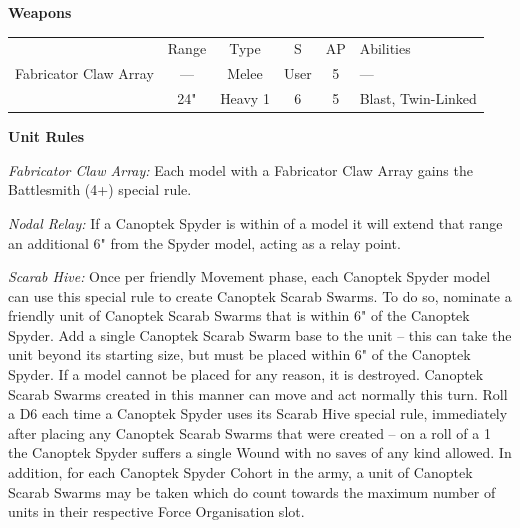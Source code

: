 \begin{minipage}[t]{0.72\textwidth}
	\vspace*{2em}
	\textbf{Weapons}
	
	\begin{tabular}{m{95 pt} *{4}{c} >{\raggedright\arraybackslash}p{130pt}}
		& Range & Type & S & AP & Abilities \\
		Fabricator Claw Array & — & Melee & User & 5 & — \\
		\quickref{Particle Beamer} & 24" & Heavy 1 & 6 & 5 & Blast, Twin-Linked \\
	\end{tabular}
	
	\vspace*{2em}
	\textbf{Unit Rules}
	
	\textit{Fabricator Claw Array:} Each model with a Fabricator Claw Array gains the Battlesmith (4+) special rule.
	
	\textit{Nodal Relay:} If a Canoptek Spyder is within  of a model it will extend that range an additional 6" from the Spyder model, acting as a relay point.
	
	\textit{Scarab Hive:} Once per friendly Movement phase, each Canoptek Spyder model can use this special rule to create Canoptek Scarab Swarms. To do so, nominate a friendly unit of Canoptek Scarab Swarms that is within 6" of the Canoptek Spyder. Add a single Canoptek Scarab Swarm base to the unit – this can take the unit beyond its starting size, but must be placed within 6" of the Canoptek Spyder. If a model cannot be placed for any reason, it is destroyed. Canoptek Scarab Swarms created in this manner can move and act normally this turn. Roll a D6 each time a Canoptek Spyder uses its Scarab Hive special rule, immediately after placing any Canoptek Scarab Swarms that were created – on a roll of a 1 the Canoptek Spyder suffers a single Wound with no saves of any kind allowed. In addition, for each Canoptek Spyder Cohort in the army, a unit of Canoptek Scarab Swarms may be taken which do count towards the maximum number of units in their respective Force Organisation slot.
	

\end{minipage}
